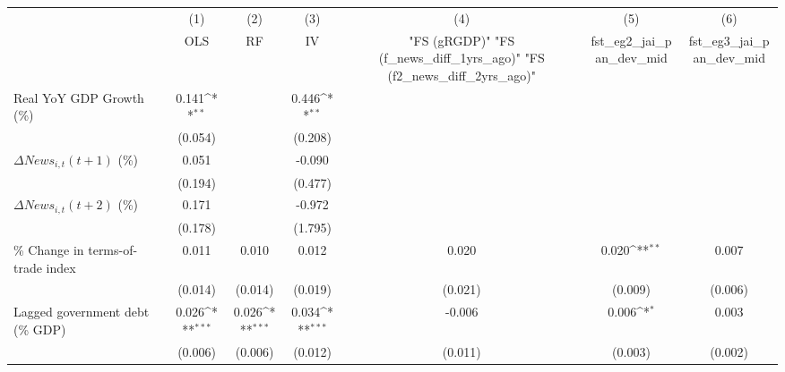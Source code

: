 {
\def\sym#1{\ifmmode^{#1}\else\(^{#1}\)\fi}
\begin{tabular}{l*{6}{c}}
\toprule
                    &\multicolumn{1}{c}{(1)}&\multicolumn{1}{c}{(2)}&\multicolumn{1}{c}{(3)}&\multicolumn{1}{c}{(4)}&\multicolumn{1}{c}{(5)}&\multicolumn{1}{c}{(6)}\\
                    &\multicolumn{1}{c}{OLS}&\multicolumn{1}{c}{RF}&\multicolumn{1}{c}{IV}&\multicolumn{1}{c}{ "FS (gRGDP)"  "FS (f_news_diff_1yrs_ago)"  "FS (f2_news_diff_2yrs_ago)" }&\multicolumn{1}{c}{fst_eg2_jai_pan_dev_mid}&\multicolumn{1}{c}{fst_eg3_jai_pan_dev_mid}\\
\midrule
Real YoY GDP Growth (\%)&       0.141\sym{**} &                     &       0.446\sym{**} &                     &                     &                     \\
                    &     (0.054)         &                     &     (0.208)         &                     &                     &                     \\
\addlinespace
$ \Delta News_{i,t}(t+1)$ (\%)&       0.051         &                     &      -0.090         &                     &                     &                     \\
                    &     (0.194)         &                     &     (0.477)         &                     &                     &                     \\
\addlinespace
$ \Delta News_{i,t}(t+2)$ (\%)&       0.171         &                     &      -0.972         &                     &                     &                     \\
                    &     (0.178)         &                     &     (1.795)         &                     &                     &                     \\
\addlinespace
\% Change in terms-of-trade index&       0.011         &       0.010         &       0.012         &       0.020         &       0.020\sym{**} &       0.007         \\
                    &     (0.014)         &     (0.014)         &     (0.019)         &     (0.021)         &     (0.009)         &     (0.006)         \\
\addlinespace
Lagged government debt (\% GDP)&       0.026\sym{***}&       0.026\sym{***}&       0.034\sym{***}&      -0.006         &       0.006\sym{*}  &       0.003         \\
                    &     (0.006)         &     (0.006)         &     (0.012)         &     (0.011)         &     (0.003)         &     (0.002)         \\

\end{tabular}}
